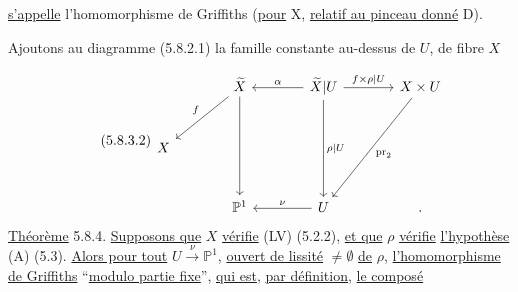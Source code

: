 \underline{s'appelle} l'homomorphisme de Griffiths (\underline{pour} X, \underline{relatif au pinceau donné} D).



Ajoutons au diagramme (5.8.2.1) la famille constante au-dessus de $U$, de fibre $X$

\begin{equation}\tag{5.8.3.2}
\begin{tikzcd}[row sep=large, column sep=large]
 {} & \widetilde{X} \arrow[dl, "f"'] \arrow[dd] & \widetilde{X}|U \arrow[l, "\alpha"'] \arrow[r, "f\times\rho|U"] \arrow[dd, "\rho|U"] & X\times U \arrow[ddl, "\mathrm{pr}_2"] \\
X & {} & {} & {} \\
 {} & \mathbb{P}^1 & U \arrow[l, "\nu"'] & .
\end{tikzcd}
\end{equation}
\underline{Théorème} 5.8.4. \underline{Supposons que} $X$ \underline{vérifie} (LV) (5.2.2), \underline{et que} $\rho$ \underline{vérifie} \underline{l'hypothèse} (A) (5.3). \underline{Alors pour tout} $U \xrightarrow{\ \nu\ } \mathbb{P}^1$, \underline{ouvert de lissité} $\neq \emptyset$ \underline{de} $\rho$, \underline{l'homomorphisme de Griffiths} ``\underline{modulo partie fixe}'', \underline{qui est}, \underline{par définition}, \underline{le composé}

